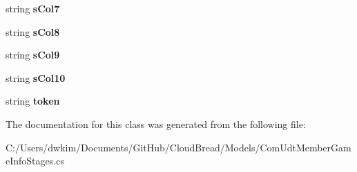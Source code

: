 \begin{DoxyCompactItemize}
\item 
string {\bfseries s\+Col7}\hypertarget{a00070_a6cc87472d889c609fcf37007b3b6db66}{}\label{a00070_a6cc87472d889c609fcf37007b3b6db66}

\item 
string {\bfseries s\+Col8}\hypertarget{a00070_a9136f45cc298a9af36c7c6146980b134}{}\label{a00070_a9136f45cc298a9af36c7c6146980b134}

\item 
string {\bfseries s\+Col9}\hypertarget{a00070_a540b727192b9acd0443d443678edeaaf}{}\label{a00070_a540b727192b9acd0443d443678edeaaf}

\item 
string {\bfseries s\+Col10}\hypertarget{a00070_ab547f520c6d7d7cba6f88c3124148d38}{}\label{a00070_ab547f520c6d7d7cba6f88c3124148d38}

\item 
string {\bfseries token}\hypertarget{a00070_a1fdef12fe6dbf63ac25c802c9436a0aa}{}\label{a00070_a1fdef12fe6dbf63ac25c802c9436a0aa}

\end{DoxyCompactItemize}


The documentation for this class was generated from the following file\+:\begin{DoxyCompactItemize}
\item 
C\+:/\+Users/dwkim/\+Documents/\+Git\+Hub/\+Cloud\+Bread/\+Models/Com\+Udt\+Member\+Game\+Info\+Stages.\+cs\end{DoxyCompactItemize}

